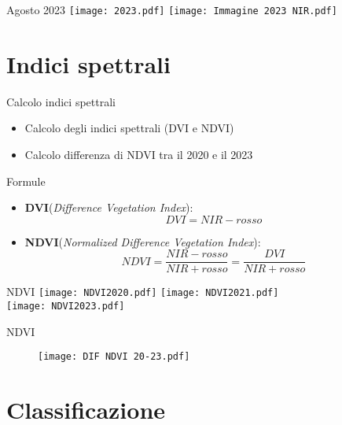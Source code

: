 \documentclass{beamer}
\begin{document}
\begin{frame}{Agosto 2023}
\centering
\texttt{[image: 2023.pdf]}
\texttt{[image: Immagine 2023 NIR.pdf]}
\end{frame}

\section{Indici spettrali}

\begin{frame}{Calcolo indici spettrali}
\begin{itemize}
    \item Calcolo degli indici spettrali (DVI e NDVI)
    \item \pause Calcolo differenza di NDVI tra il 2020 e il 2023
\end{itemize}
    
\end{frame}

\begin{frame}{Formule}
    \begin{itemize}
    \item  \textbf{DVI}(\textit{Difference Vegetation Index}):
    \begin{equation}
        DVI = NIR - rosso
    \end{equation}
    \item \textbf{NDVI}(\textit{Normalized Difference Vegetation Index}):
    \begin{equation}
        NDVI = \frac{NIR - rosso}{NIR + rosso} = \frac{DVI}{NIR + rosso}
    \end{equation}
\end{itemize}
\end{frame}

\begin{frame}{NDVI}
\centering
\texttt{[image: NDVI2020.pdf]}
\texttt{[image: NDVI2021.pdf]}\\
\texttt{[image: NDVI2023.pdf]}
\end{frame}

\begin{frame}{NDVI}
\begin{figure}
    \centering
    \texttt{[image: DIF NDVI 20-23.pdf]}
    \end{figure}
\end{frame}

\section{Classificazione}
\end{document}
